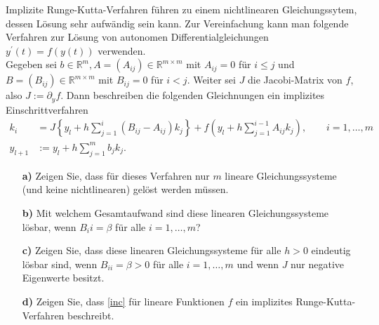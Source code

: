 \begin{exercise}
Implizite Runge-Kutta-Verfahren führen zu einem nichtlinearen Gleichungssytem,
dessen Lösung sehr aufwändig sein kann. Zur Vereinfachung kann man folgende
Verfahren zur Lösung von autonomen Differentialgleichungen $y^{\prime}(t) = f(y(t))$
verwenden. \\
Gegeben sei $b \in \mathbb{R}^m, A = (A_{ij}) \in \mathbb{R}^{m \times m}$ mit
$A_{ij} = 0$ für $i \leq j$ und $B = (B_{ij}) \in \mathbb{R}^{m \times m}$ mit
$B_{ij} = 0$ für $i < j$. Weiter sei $J$ die Jacobi-Matrix von $f$, also
$J := \partial_y f$. Dann beschreiben die folgenden Gleichnungen ein implizites
Einschrittverfahren
\begin{align} \label{inc}
  k_i &= J\left\{y_l + h\sum_{j=1}^i(B_{ij} - A_{ij})k_j\right\} + f\left(y_l +
  h\sum_{j=1}^{i-1}A_{ij}k_j\right), \qquad i = 1,\dots,m \\
  y_{l+1} &:= y_l + h\sum_{j=1}^m b_jk_j.
\end{align}
\begin{itemize}
  \item [\textbf{a)}] Zeigen Sie, dass für dieses Verfahren nur $m$ lineare
  Gleichungssysteme (und keine nichtlinearen) gelöst werden müssen.
  \item [\textbf{b)}] Mit welchem Gesamtaufwand sind diese linearen Gleichungssysteme
  lösbar, wenn $B_ii = \beta$ für alle $i = 1,\dots,m$?
  \item [\textbf{c)}] Zeigen Sie, dass diese linearen Gleichungssysteme für alle
  $h > 0$ eindeutig lösbar sind, wenn $B_{ii} = \beta > 0$ für alle $i = 1,\dots,m$
  und wenn $J$ nur negative Eigenwerte besitzt.
  \item [\textbf{d)}] Zeigen Sie, dass \eqref{inc} für lineare Funktionen $f$ ein
  implizites Runge-Kutta-Verfahren beschreibt.
\end{itemize}
\end{exercise}
\begin{solution}

\end{solution}
